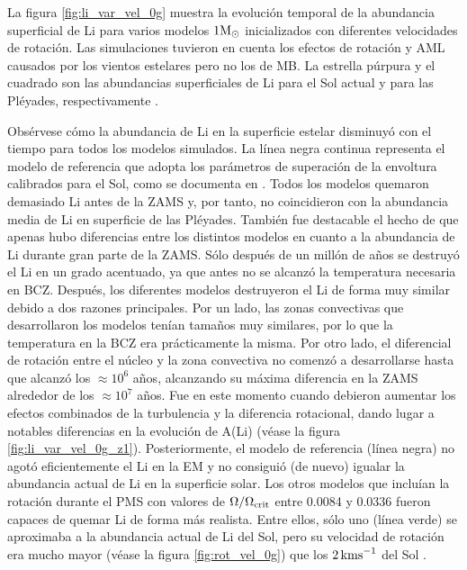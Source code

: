 La figura \ref{fig:li_var_vel_0g} muestra la evolución temporal de la abundancia superficial de Li para varios modelos $1\mathrm{M}_\odot$ inicializados con diferentes velocidades de rotación. Las simulaciones tuvieron en cuenta los efectos de rotación y AML causados por los vientos estelares pero no los de MB. La estrella púrpura y el cuadrado son las abundancias superficiales de Li para el Sol actual \cite{Asplund2009} y para las Pléyades, respectivamente \cite{Sestito2005}.\par

Obsérvese cómo la abundancia de Li en la superficie estelar disminuyó con el tiempo para todos los modelos simulados. La línea negra continua representa el modelo de referencia que adopta los parámetros de superación de la envoltura calibrados para el Sol, como se documenta en \cite{Choi2016}. Todos los modelos quemaron demasiado Li antes de la ZAMS y, por tanto, no coincidieron con la abundancia media de Li en superficie de las Pléyades. También fue destacable el hecho de que apenas hubo diferencias entre los distintos modelos en cuanto a la abundancia de Li durante gran parte de la ZAMS. Sólo después de un millón de años se destruyó el Li en un grado acentuado, ya que antes no se alcanzó la temperatura necesaria en BCZ. Después, los diferentes modelos destruyeron el Li de forma muy similar debido a dos razones principales. Por un lado, las zonas convectivas que desarrollaron los modelos tenían tamaños muy similares, por lo que la temperatura en la BCZ era prácticamente la misma. Por otro lado, el diferencial de rotación entre el núcleo y la zona convectiva no comenzó a desarrollarse hasta que alcanzó los $ \approx 10^6$ años, alcanzando su máxima diferencia en la ZAMS alrededor de los $ \approx 10^7$ años. Fue en este momento cuando debieron aumentar los efectos combinados de la turbulencia y la diferencia rotacional, dando lugar a notables diferencias en la evolución de A(Li) (véase la figura \ref{fig:li_var_vel_0g_z1}). Posteriormente, el modelo de referencia (línea negra) no agotó eficientemente el Li en la EM y no consiguió (de nuevo) igualar la abundancia actual de Li en la superficie solar. Los otros modelos que incluían la rotación durante el PMS con valores de $\Omega / \Omega_{\mathrm{crit}}$ entre 0.0084 y 0.0336 fueron capaces de quemar Li de forma más realista. Entre ellos, sólo uno (línea verde) se aproximaba a la abundancia actual de Li del Sol, pero su velocidad de rotación era mucho mayor (véase la figura \ref{fig:rot_vel_0g}) que los $2\,\mathrm{kms}^{-1}$ del Sol \cite{Gill2012}. \par

